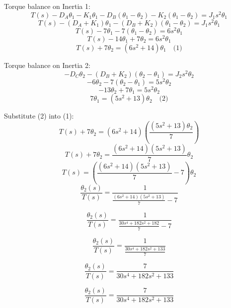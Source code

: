 Torque balance on Inertia 1:
\[
T(s) - D_A \theta_1 - K_1 \theta_1 - D_B (\theta_1 - \theta_2) - K_2 (\theta_1 - \theta_2) = J_1 s^2 \theta_1
\]
\[
T(s) - (D_A + K_1)\theta_1 - (D_B + K_2)(\theta_1 - \theta_2) = J_1 s^2 \theta_1
\]
\[
T(s) - 7\theta_1 - 7(\theta_1 - \theta_2) = 6s^2 \theta_1
\]
\[
T(s) - 14\theta_1 + 7\theta_2 = 6s^2 \theta_1
\]
\[
T(s) + 7\theta_2 = (6s^2 + 14)\theta_1 \quad \text{(1)}
\]

Torque balance on Inertia 2:
\[
- D_C \theta_2 - (D_B + K_2)(\theta_2 - \theta_1) = J_2 s^2 \theta_2
\]
\[
- 6\theta_2 - 7(\theta_2 - \theta_1) = 5s^2 \theta_2
\]
\[
-13\theta_2 + 7\theta_1 = 5s^2 \theta_2
\]
\[
7\theta_1 = (5s^2 + 13)\theta_2 \quad \text{(2)}
\]

Substitute (2) into (1):
\[
T(s) + 7\theta_2 = (6s^2 + 14)\left( \frac{(5s^2 + 13)\theta_2}{7} \right)
\]
\[
T(s) + 7\theta_2 = \frac{(6s^2 + 14)(5s^2 + 13)}{7} \theta_2
\]
\[
T(s) = \left( \frac{(6s^2 + 14)(5s^2 + 13)}{7} - 7 \right) \theta_2
\]
\[
\frac{\theta_2(s)}{T(s)} = \frac{1}{\frac{(6s^2 + 14)(5s^2 + 13)}{7} - 7}
\]

\[
\frac{\theta_2(s)}{T(s)}= \frac{1}{\frac{30s^4 + 182s^2 + 182}{7} - 7}
\]

\[
\frac{\theta_2(s)}{T(s)}= \frac{1}{\frac{30s^4 + 182s^2 + 133}{7}}
\]

\[
\frac{\theta_2(s)}{T(s)}= \frac{7}{30s^4 + 182s^2 + 133}
\]

\[
\boxed{\frac{\theta_2(s)}{T(s)} = \frac{7}{30s^4 + 182s^2 + 133}}
\]